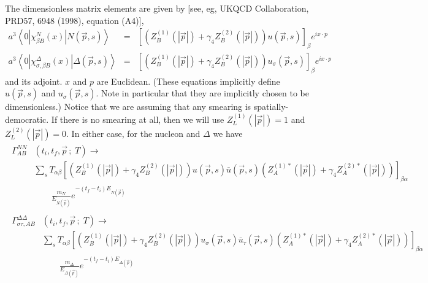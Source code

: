\documentclass[12pt]{article}
\begin{document}
The dimensionless matrix elements are given by
[see, eg, UKQCD Collaboration, PRD57, 6948 (1998), equation (A4)],
\begin{eqnarray*}
a^3\left<0\left|\chi^N_{\beta B}(x)\right|N(\vec{p},s)\right>
 &=& \left[\left(Z_B^{(1)}(|\vec{p}|)+\gamma_4Z_B^{(2)}(|\vec{p}|)\right)
   u(\vec{p},s)\right]_\beta e^{ix\cdot p} \\
a^3\left<0\left|\chi^{\Delta}_{\sigma,\beta B}(x)\right|\Delta(\vec{p},s)\right>
 &=& \left[\left(Z_B^{(1)}(|\vec{p}|)+\gamma_4Z_B^{(2)}(|\vec{p}|)\right)
   u_\sigma(\vec{p},s)\right]_\beta e^{ix\cdot p}
\end{eqnarray*}
and its adjoint.  $x$ and $p$ are Euclidean.
(These equations implicitly define $u(\vec{p},s)$ and
$u_\sigma(\vec{p},s)$.  Note in particular that they are implicitly chosen
to be dimensionless.)  Notice that we are assuming
that any smearing is spatially-democratic.  If there is no smearing at
all, then we will use $Z_L^{(1)}(|\vec{p}|)=1$ and
$Z_L^{(2)}(|\vec{p}|)=0$.  In either case, for the nucleon and
$\Delta$ we have
\begin{gather*}
\begin{split}
\Gamma^{NN}_{AB}&(t_i,t_f,\vec{p}\,;\;T) \to \\
&\sum_s T_{\alpha\beta}
\left[\left(Z_B^{(1)}(|\vec{p}|)+\gamma_4Z_B^{(2)}(|\vec{p}|)\right)
u(\vec{p},s)\bar{u}(\vec{p},s)
\left(Z_A^{(1)*}(|\vec{p}|)+\gamma_4Z_A^{(2)*}(|\vec{p}|)\right)
\right]_{\beta\alpha} \\
&\qquad\frac{m_N}{E_{N(\vec{p})}}e^{-(t_f-t_i)E_{N(\vec{p})}}
\end{split} \\
\begin{split}
\Gamma^{\Delta\Delta}_{\sigma\tau,AB}&(t_i,t_f,\vec{p}\,;\;T) \to \\
&\sum_s T_{\alpha\beta}
\left[\left(Z_B^{(1)}(|\vec{p}|)+\gamma_4Z_B^{(2)}(|\vec{p}|)\right)
u_\sigma(\vec{p},s)\bar{u}_\tau(\vec{p},s)
\left(Z_A^{(1)*}(|\vec{p}|)+\gamma_4Z_A^{(2)*}(|\vec{p}|)\right)
\right]_{\beta\alpha} \\
&\qquad\frac{m_\Delta}{E_{\Delta(\vec{p})}}e^{-(t_f-t_i)E_{\Delta(\vec{p})}}
\end{split}
\end{gather*}
\end{document}
